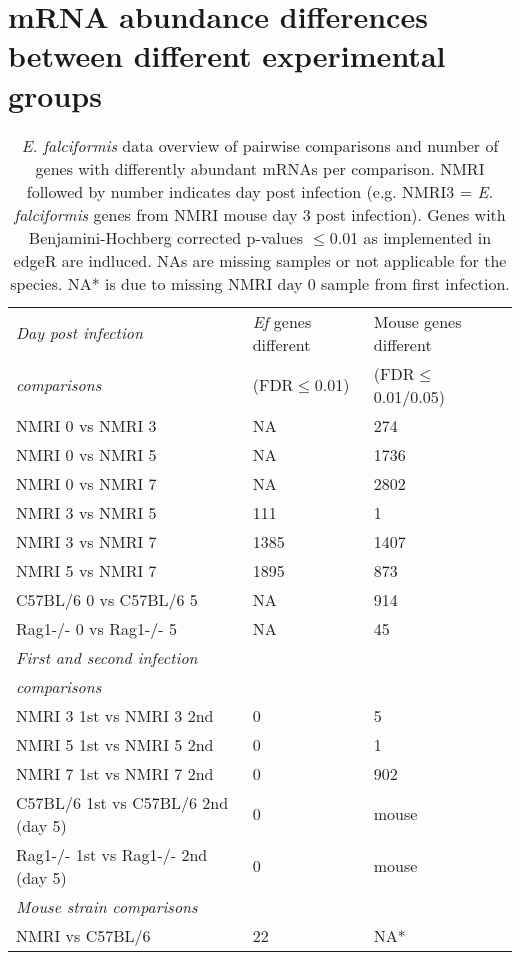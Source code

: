\documentclass{article}
\begin{document}
\section{mRNA abundance differences between different experimental groups}
\setlength{\tabcolsep}{8pt}
\begin{table}[H]
\begin{center}
\caption{\textit{E. falciformis} data overview of pairwise comparisons and number of genes with differently abundant mRNAs per comparison. NMRI followed by number indicates day post infection (e.g. NMRI3 = \textit{E. falciformis} genes from NMRI mouse day 3 post infection). Genes with Benjamini-Hochberg corrected p-values $\leq$0.01 as implemented in edgeR are indluced. NAs are missing samples or not applicable for the species. NA* is due to missing NMRI day 0 sample from first infection.}
\begin{tabular}{*3l}    \toprule
\textit{Day post infection} & \textit{Ef} genes different & Mouse genes different \\ 
	\textit{comparisons} 	    & (FDR$\leq$0.01) &  (FDR$\leq$0.01/0.05) \\ \midrule
	NMRI 0 vs NMRI 3		& NA   & 274 \\
	NMRI 0 vs NMRI 5		& NA   & 1736 \\
	NMRI 0 vs NMRI 7		& NA   & 2802 \\
	NMRI 3 vs NMRI 5     		& 111  & 1 \\
	NMRI 3 vs NMRI 7  		& 1385 & 1407 \\ 
	NMRI 5 vs NMRI 7  		& 1895 & 873 \\ 
	C57BL/6 0 vs C57BL/6 5		& NA	& 914 \\
	Rag1-/- 0 vs Rag1-/- 5		& NA	& 45 \\ \midrule
\textit{First and second infection} & 		 & 	 \\ 
\textit{comparisons} 	    & 		& 	\\ \midrule
	NMRI 3 1st vs NMRI 3 2nd  	& 0  & 5 \\
	NMRI 5 1st vs NMRI 5 2nd  	& 0  & 1 \\
	NMRI 7 1st vs NMRI 7 2nd  	& 0  & 902 \\
	C57BL/6 1st vs C57BL/6 2nd (day 5) & 0 &  mouse \\
	Rag1-/- 1st vs Rag1-/- 2nd (day 5) & 0 & mouse  \\ \midrule
\textit{Mouse strain comparisons} & 		 & 	 \\ \midrule
	NMRI vs C57BL/6 		& 22 	& NA* \\		

\end{tabular}
\end{center}
\end{table}
\end{document}
